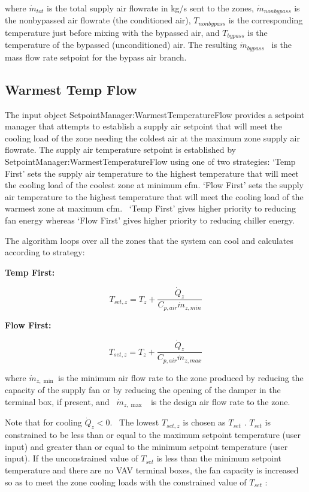 where \({\dot m_{tot}}\) is the total supply air flowrate in kg/s sent to the zones, \({\dot m_{nonbypass}}\) is the nonbypassed air flowrate (the conditioned air), \({T_{nonbypass}}\) is the corresponding temperature just before mixing with the bypassed air, and \({T_{bypass}}\) is the temperature of the bypassed (unconditioned) air. The resulting \({\dot m_{bypass}}\) ~is the mass flow rate setpoint for the bypass air branch.

\subsection{Warmest Temp Flow}\label{warmest-temp-flow}

The input object SetpointManager:WarmestTemperatureFlow provides a setpoint manager that attempts to establish a supply air setpoint that will meet the cooling load of the zone needing the coldest air at the maximum zone supply air flowrate. The supply air temperature setpoint is established by SetpointManager:WarmestTemperatureFlow using one of two strategies: `Temp First' sets the supply air temperature to the highest temperature that will meet the cooling load of the coolest zone at minimum cfm. `Flow First' sets the supply air temperature to the highest temperature that will meet the cooling load of the warmest zone at maximum cfm.~ `Temp First' gives higher priority to reducing fan energy whereas `Flow First' gives higher priority to reducing chiller energy.

The algorithm loops over all the zones that the system can cool and calculates according to strategy:

\textbf{Temp First:}

\begin{equation}
  T_{set,z} = T_z + \frac{\dot{Q}_z}{C_{p,air} \dot{m}_{z,min}}
\end{equation}

\textbf{Flow First:}

\begin{equation}
  T_{set,z} = T_z + \frac{\dot{Q}_z}{C_{p,air} \dot{m}_{z,max}}
\end{equation}

where \({\dot m_{z,\min }}\) is the minimum air flow rate to the zone produced by reducing the capacity of the supply fan or by reducing the opening of the damper in the terminal box, if present, and~ \({\dot m_{z,\max }}\) ~is the design air flow rate to the zone.

Note that for cooling \({\dot Q_z} < 0.\) ~The lowest \({T_{set,z}}\) is chosen as \({T_{set}}\) . \({T_{set}}\) is constrained to be less than or equal to the maximum setpoint temperature (user input) and greater than or equal to the minimum setpoint temperature (user input). If the unconstrained value of \({T_{set}}\) is less than the minimum setpoint temperature and there are no VAV terminal boxes, the fan capacity is increased so as to meet the zone cooling loads with the constrained value of \({T_{set}}\) :

